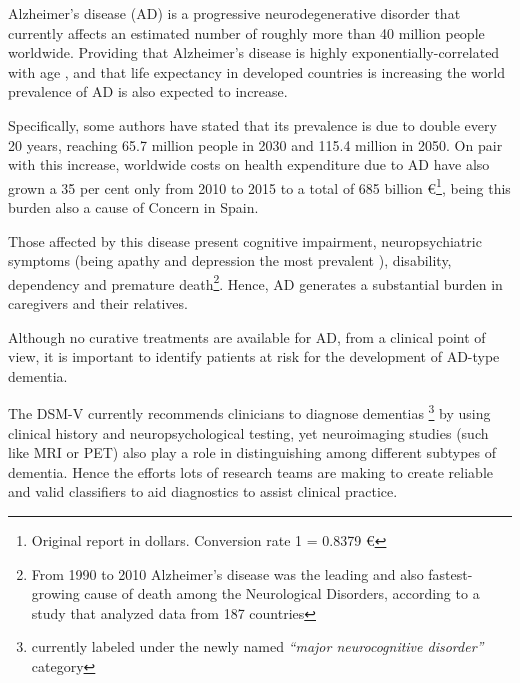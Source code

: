 \documentclass[a4paper,12pt]{elsarticle}  %
\begin{document}
%

Alzheimer's disease (AD) is a progressive neurodegenerative disorder that currently affects an estimated number of roughly more than 40 million people worldwide\cite{Scheltens2016505, Prince201363}. Providing that Alzheimer's disease is highly exponentially-correlated with age \cite{Prince201363}, and that life expectancy in developed countries is increasing\cite{Kontis20171323} the world prevalence of AD is also expected to increase.

Specifically, some authors have stated that its prevalence is due to double every 20 years, reaching 65.7 million people in 2030 and 115.4 million in 2050\cite{Prince201363}. On pair with this increase, worldwide costs on health expenditure due to AD have also grown a 35 per cent only from 2010 to 2015 to a total of 685 billion \euro \footnote{Original report in dollars. Conversion rate 1  = 0.8379 \euro}\cite{CantareroPrieto201758}, being this burden also a cause of Concern in Spain\cite{Wimo20171, Olazaran20171}.

Those affected by this disease present cognitive impairment, neuropsychiatric symptoms (being apathy and depression the most prevalent \cite{Zhao2016264}), disability, dependency \cite{Lozano20122095} and premature death\cite{Lozano20122095,VanDeVorst2015}\footnote{From 1990 to 2010 Alzheimer's disease was the leading and also fastest-growing cause of death among the Neurological Disorders, according to a study that analyzed data from 187 countries}. Hence, AD generates a substantial burden in caregivers and their relatives.


Although no curative treatments are available for AD\cite{Scheltens2016505}, from a clinical point of view, it is important to identify patients at risk for the development of AD-type dementia\cite{Herukka2017285}.


The DSM-V currently recommends clinicians to diagnose dementias \footnote{currently labeled under the newly named \textit{``major neurocognitive disorder''} category} by using clinical history and neuropsychological testing, yet neuroimaging studies (such like MRI or PET) also play a role in distinguishing among different subtypes of dementia. Hence the efforts lots of research teams are making to create reliable and valid classifiers to aid diagnostics to assist clinical practice.   
\end{document}
